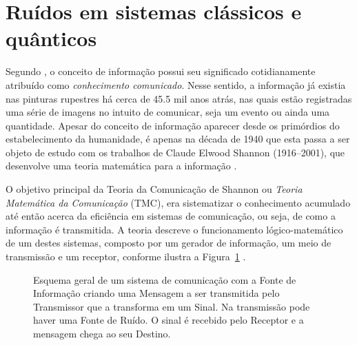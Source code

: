 \section{Ruídos em sistemas clássicos e quânticos}\label{sec:ruidos}

Segundo \textcite{conceitoinformação}, o conceito de informação possui seu significado cotidianamente atribuído como \textit{conhecimento comunicado}. Nesse sentido, a informação já existia nas pinturas rupestres há cerca de \num{45.5} mil anos atrás, nas quais estão registradas uma série de imagens no intuito de comunicar, seja um evento ou ainda uma quantidade. Apesar do conceito de informação aparecer desde os primórdios do estabelecimento da humanidade, é apenas na década de 1940 que esta passa a ser objeto de estudo com os trabalhos de Claude Elwood Shannon (1916--2001), que desenvolve uma teoria matemática para a informação \cite{CiênciaTransiçãoSeculosa}.

O objetivo principal da Teoria da Comunicação de Shannon ou \textit{Teoria Matemática da Comunicação} (TMC), era sistematizar o conhecimento acumulado até então acerca da eficiência em sistemas de comunicação, ou seja, de como a informação é transmitida. A teoria descreve o funcionamento lógico-matemático de um destes sistemas, composto por um gerador de informação, um meio de transmissão e um receptor, conforme ilustra a Figura~\ref{comunicshannon} \cite{MTC}.

\begin{figure}[ht!]
  \centering
  \caption{Esquema geral de um sistema de comunicação com a Fonte de Informação criando uma Mensagem a ser transmitida pelo Transmissor que a transforma em um Sinal. Na transmissão pode haver uma Fonte de Ruído. O sinal é recebido pelo Receptor e a mensagem chega ao seu Destino.}\label{comunicshannon}
\end{figure}

